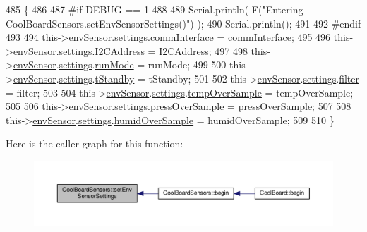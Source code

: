 \begin{DoxyCode}
485 \{
486 
487 \textcolor{preprocessor}{#if DEBUG == 1}
488     
489     Serial.println( F(\textcolor{stringliteral}{"Entering CoolBoardSensors.setEnvSensorSettings()"}) );
490     Serial.println();
491 
492 \textcolor{preprocessor}{#endif}
493   
494     this->\hyperlink{class_cool_board_sensors_a868e38985e9a2412829fa2790ca13e2e}{envSensor}.\hyperlink{class_b_m_e280_af06253eb2f8ad4b5fabb858bc4a973bf}{settings}.\hyperlink{struct_sensor_settings_a5bf116387c543a6ea5732976424e8cb1}{commInterface} = commInterface;      
495 
496     this->\hyperlink{class_cool_board_sensors_a868e38985e9a2412829fa2790ca13e2e}{envSensor}.\hyperlink{class_b_m_e280_af06253eb2f8ad4b5fabb858bc4a973bf}{settings}.\hyperlink{struct_sensor_settings_af8103021dbce7e5ee6d786c4893324f7}{I2CAddress} = I2CAddress;
497 
498     this->\hyperlink{class_cool_board_sensors_a868e38985e9a2412829fa2790ca13e2e}{envSensor}.\hyperlink{class_b_m_e280_af06253eb2f8ad4b5fabb858bc4a973bf}{settings}.\hyperlink{struct_sensor_settings_a0ffbdf34f4c23a2a167f00e4cb971dec}{runMode} = runMode; 
499 
500     this->\hyperlink{class_cool_board_sensors_a868e38985e9a2412829fa2790ca13e2e}{envSensor}.\hyperlink{class_b_m_e280_af06253eb2f8ad4b5fabb858bc4a973bf}{settings}.\hyperlink{struct_sensor_settings_a7098be3c1df0271dc9bc0fb45c1e9bb9}{tStandby} = tStandby; 
501 
502     this->\hyperlink{class_cool_board_sensors_a868e38985e9a2412829fa2790ca13e2e}{envSensor}.\hyperlink{class_b_m_e280_af06253eb2f8ad4b5fabb858bc4a973bf}{settings}.\hyperlink{struct_sensor_settings_a69dc95368069a0f408a141d4c2cbf045}{filter} = filter; 
503 
504     this->\hyperlink{class_cool_board_sensors_a868e38985e9a2412829fa2790ca13e2e}{envSensor}.\hyperlink{class_b_m_e280_af06253eb2f8ad4b5fabb858bc4a973bf}{settings}.\hyperlink{struct_sensor_settings_abdedc9d05f4850c58005313486958073}{tempOverSample} = tempOverSample;
505 
506     this->\hyperlink{class_cool_board_sensors_a868e38985e9a2412829fa2790ca13e2e}{envSensor}.\hyperlink{class_b_m_e280_af06253eb2f8ad4b5fabb858bc4a973bf}{settings}.\hyperlink{struct_sensor_settings_a85ba10cad25b479bba9cb42c6400ab21}{pressOverSample} = pressOverSample;
507 
508     this->\hyperlink{class_cool_board_sensors_a868e38985e9a2412829fa2790ca13e2e}{envSensor}.\hyperlink{class_b_m_e280_af06253eb2f8ad4b5fabb858bc4a973bf}{settings}.\hyperlink{struct_sensor_settings_a4a02fc7708071b88ccf610e3f7ed9d55}{humidOverSample} = humidOverSample;
509 
510 \}
\end{DoxyCode}
Here is the caller graph for this function\+:\nopagebreak
\begin{figure}[H]
\begin{center}
\leavevmode
\includegraphics[width=350pt]{de/d46/class_cool_board_sensors_a406307ffd70272282d91479c7ed8d66f_icgraph}
\end{center}
\end{figure}



